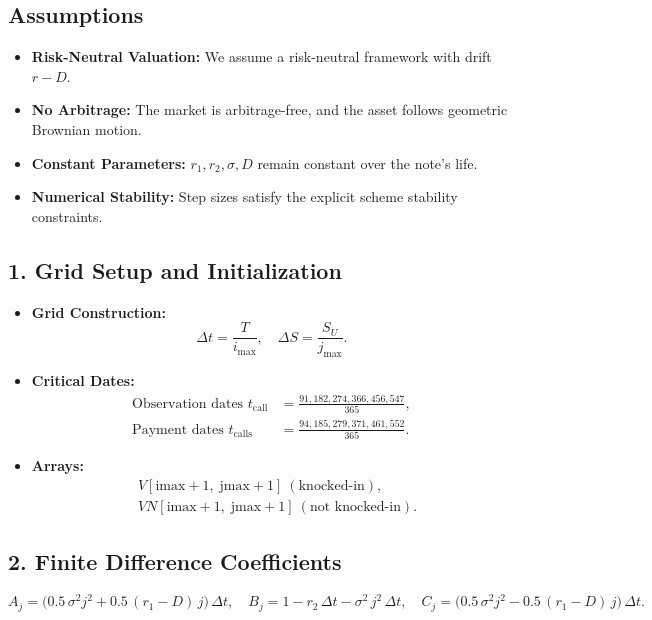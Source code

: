 \documentclass[12pt,a4paper]{article}
\begin{document}
\subsection*{Assumptions}
\begin{itemize}
\item \textbf{Risk-Neutral Valuation:} We assume a risk-neutral framework with drift \(r - D\).
\item \textbf{No Arbitrage:} The market is arbitrage-free, and the asset follows geometric Brownian motion.
\item \textbf{Constant Parameters:} \(r_1, r_2, \sigma, D\) remain constant over the note’s life.
\item \textbf{Numerical Stability:} Step sizes satisfy the explicit scheme stability constraints.
\end{itemize}

\subsection*{1. Grid Setup and Initialization}
\begin{itemize}
\item \textbf{Grid Construction:}
  \[
    \Delta t = \frac{T}{i_{\max}}, 
    \quad 
    \Delta S = \frac{S_U}{j_{\max}}.
  \]
\item \textbf{Critical Dates:}
  \begin{align*}
    \text{Observation dates } t_{\text{call}} &= \frac{91, 182, 274, 366, 456, 547}{365}, \\[1ex]
    \text{Payment dates } t_{\text{calls}} &= \frac{94, 185, 279, 371, 461, 552}{365}.
  \end{align*}
\item \textbf{Arrays:}
  \begin{align*}
    &V[\text{imax}+1,\; \text{jmax}+1]\ (\text{knocked-in}), \\
    &VN[\text{imax}+1,\; \text{jmax}+1]\ (\text{not knocked-in}).
  \end{align*}
\end{itemize}

\subsection*{2. Finite Difference Coefficients}
\[
  A_j = \bigl(0.5\,\sigma^2 j^2 + 0.5\,(r_1 - D)\,j\bigr)\,\Delta t, \quad
  B_j = 1 - r_2\,\Delta t - \sigma^2\,j^2\,\Delta t, \quad
  C_j = \bigl(0.5\,\sigma^2 j^2 - 0.5\,(r_1 - D)\,j\bigr)\,\Delta t.
\]
\end{document}
